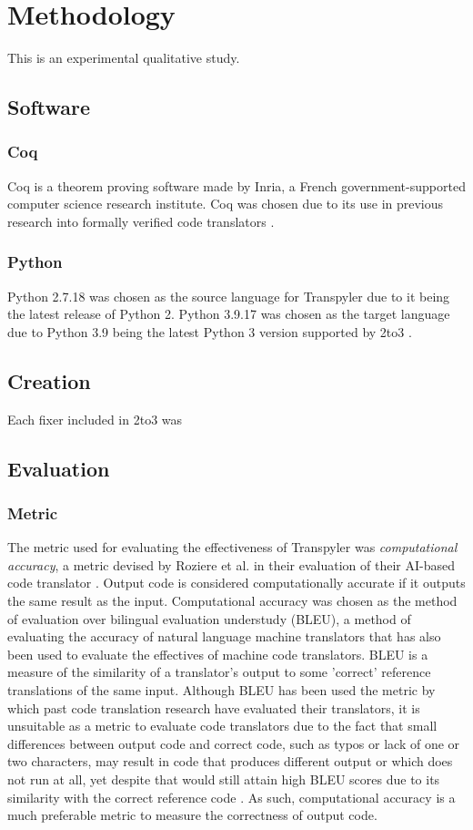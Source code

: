 \section{Methodology}
This is an experimental qualitative study.
\subsection{Software}
\subsubsection{Coq}
Coq is a theorem proving software made by Inria, a French government-supported computer science research institute. Coq was chosen due to its use in previous research into formally verified code translators \autocite{Roziere}\autocite{Zhao}.
\subsubsection{Python}
Python 2.7.18 was chosen as the source language for Transpyler due to it being the latest release of Python 2. Python 3.9.17 was chosen as the target language due to Python 3.9 being the latest Python 3 version supported by 2to3 \autocite{2to3}.
\subsection{Creation}
Each fixer included in 2to3 was 
\subsection{Evaluation}
\subsubsection{Metric}
The metric used for evaluating the effectiveness of Transpyler was \textit{computational accuracy}, a metric devised by Roziere et al. in their evaluation of their AI-based code translator \autocite{Roziere}. Output code is considered computationally accurate if it outputs the same result as the input. Computational accuracy was chosen as the method of evaluation over bilingual evaluation understudy (BLEU), a method of evaluating the accuracy of natural language machine translators that has also been used to evaluate the effectives of machine code translators. BLEU is a measure of the similarity of a translator's output to some 'correct' reference translations of the same input. Although BLEU has been used the metric by which past code translation research have evaluated their translators, it is unsuitable as a metric to evaluate code translators due to the fact that small differences between output code and correct code, such as typos or lack of one or two characters, may result in code that produces different output or which does not run at all, yet despite that would still attain high BLEU scores due to its similarity with the correct reference code \autocite{Roziere}. As such, computational accuracy is a much preferable metric to measure the correctness of output code.
